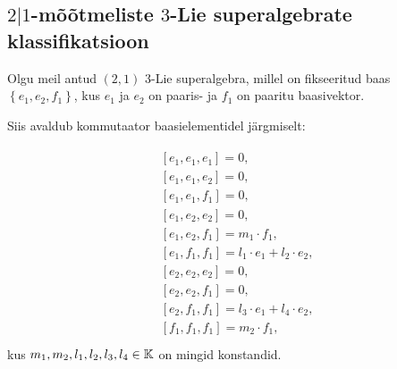 
\subsection{\texorpdfstring{$2|1$}{1|2}-mõõtmeliste
    \texorpdfstring{$3$}{3}-Lie superalgebrate klassifikatsioon}

Olgu meil antud $(2, 1)$ 3-Lie superalgebra, millel on fikseeritud baas
$\left\{ e_1, e_2, f_1 \right\}$, kus $e_1$ ja $e_2$ on paaris- ja
$f_1$ on paaritu baasivektor.

Siis avaldub kommutaator baasielementidel järgmiselt:

\begin{align}\label{samasused:2-1}
    \begin{split}
        & \left[e_1, e_1, e_1\right] = 0, \\
        & \left[e_1, e_1, e_2\right] = 0, \\
        & \left[e_1, e_1, f_1\right] = 0, \\
        & \left[e_1, e_2, e_2\right] = 0, \\
        & \left[e_1, e_2, f_1\right] = m_1 \cdot f_1, \\
        & \left[e_1, f_1, f_1\right] = l_1 \cdot e_1 + l_2 \cdot e_2, \\
        & \left[e_2, e_2, e_2\right] = 0, \\
        & \left[e_2, e_2, f_1\right] = 0, \\
        & \left[e_2, f_1, f_1\right] = l_3 \cdot e_1 + l_4 \cdot e_2, \\
        & \left[f_1, f_1, f_1\right] = m_2 \cdot f_1, \\
    \end{split}
\end{align}
kus $m_1, m_2, l_1, l_2, l_3, l_4 \in \mathbb{K}$ on mingid konstandid.

